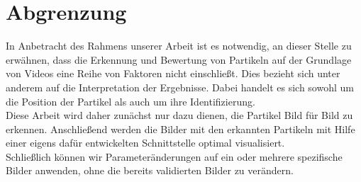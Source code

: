 \section{Abgrenzung}
In Anbetracht des Rahmens unserer Arbeit ist es notwendig, an dieser Stelle zu erwähnen, dass die Erkennung und Bewertung von Partikeln auf der Grundlage von Videos eine Reihe von Faktoren nicht einschließt. Dies bezieht sich unter anderem auf die Interpretation der Ergebnisse. Dabei handelt es sich sowohl um die Position der Partikel als auch um ihre Identifizierung.\\
Diese Arbeit wird daher zunächst nur dazu dienen, die Partikel Bild für Bild zu erkennen. Anschließend werden die Bilder mit den erkannten Partikeln mit Hilfe einer eigens dafür entwickelten Schnittstelle optimal visualisiert.\\ Schließlich können wir Parameteränderungen auf ein oder mehrere spezifische Bilder anwenden, ohne die bereits validierten Bilder zu verändern.



